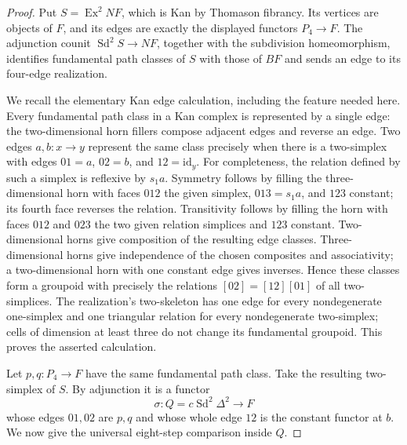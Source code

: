\begin{proof}
Put $S=\operatorname{Ex}^2 NF$, which is Kan by Thomason fibrancy. Its vertices are objects of $F$, and its edges are exactly the displayed functors $P_4\to F$. The adjunction counit $\operatorname{Sd}^2S\to NF$, together with the subdivision homeomorphism, identifies fundamental path classes of $S$ with those of $BF$ and sends an edge to its four-edge realization.

We recall the elementary Kan edge calculation, including the feature needed here. Every fundamental path class in a Kan complex is represented by a single edge: the two-dimensional horn fillers compose adjacent edges and reverse an edge. Two edges $a,b:x\to y$ represent the same class precisely when there is a two-simplex with edges $01=a$, $02=b$, and $12=\mathrm{id}_y$. For completeness, the relation defined by such a simplex is reflexive by $s_1a$. Symmetry follows by filling the three-dimensional horn with faces $012$ the given simplex, $013=s_1a$, and $123$ constant; its fourth face reverses the relation. Transitivity follows by filling the horn with faces $012$ and $023$ the two given relation simplices and $123$ constant. Two-dimensional horns give composition of the resulting edge classes. Three-dimensional horns give independence of the chosen composites and associativity; a two-dimensional horn with one constant edge gives inverses. Hence these classes form a groupoid with precisely the relations $[02]=[12][01]$ of all two-simplices. The realization's two-skeleton has one edge for every nondegenerate one-simplex and one triangular relation for every nondegenerate two-simplex; cells of dimension at least three do not change its fundamental groupoid. This proves the asserted calculation.

Let $p,q:P_4\to F$ have the same fundamental path class. Take the resulting two-simplex of $S$. By adjunction it is a functor
\[
 \sigma:Q=c\operatorname{Sd}^2\Delta^2\longrightarrow F
\]
whose edges $01,02$ are $p,q$ and whose whole edge $12$ is the constant functor at $b$. We now give the universal eight-step comparison inside $Q$.


\end{proof}
